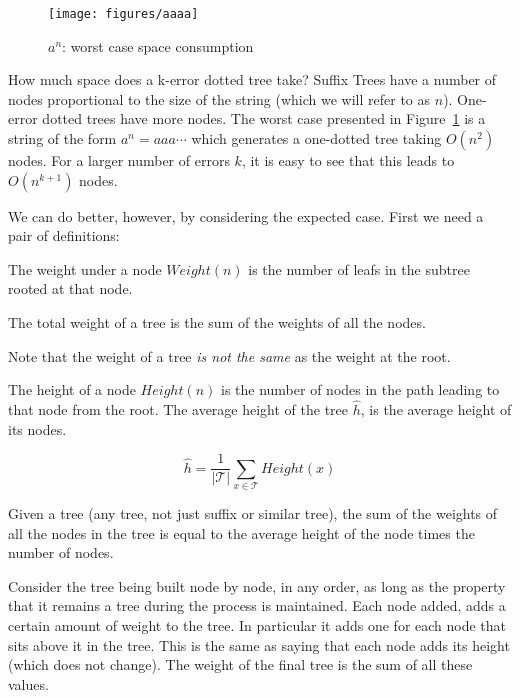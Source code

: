 \begin{figure}
\texttt{[image: figures/aaaa]}
\caption{$a^n$: worst case space consumption}%
\label{fig:aaaa}
\end{figure}

How much space does a k-error dotted tree take? Suffix Trees have a number of nodes proportional to the size of the string (which we will refer to as $n$). One-error dotted trees have more nodes. The worst case presented in Figure~\ref{fig:aaaa} is a string of the form $a^n = aaa\cdots$ which generates a one-dotted tree taking $O(n^2)$ nodes. For a larger number of errors $k$, it is easy to see that this leads to $O(n^{k+1})$ nodes.

We can do better, however, by considering the expected case. First we need a pair of definitions:

\begin{definition}
The weight under a node $\mathit{Weight}(n)$ is the number of leafs in the subtree rooted at that node.

The total weight of a tree is the sum of the weights of all the nodes.
\end{definition}

Note that the weight of a tree \emph{is not the same} as the weight at the root.

\begin{definition}
The height of a node $\mathit{Height}(n)$ is the number of nodes in the path leading to that node from the root. The average height of the tree $\hat{h}$, is the average height of its nodes.

\[ \hat{h} = \frac{1}{|\mathcal{T}|} \sum_{x \in \mathit{\mathcal{T}}} \mathit{Height}(x) \]
\end{definition}

\begin{lemma}
Given a tree (any tree, not just suffix or similar tree), the sum of the weights of all the nodes in the tree is equal to the average height of the node times the number of nodes.
\end{lemma}

Consider the tree being built node by node, in any order, as long as the property that it remains a tree during the process is maintained. Each node added, adds a certain amount of weight to the tree. In particular it adds one for each node that sits above it in the tree. This is the same as saying that each node adds its height (which does not change). The weight of the final tree is the sum of all these values.

